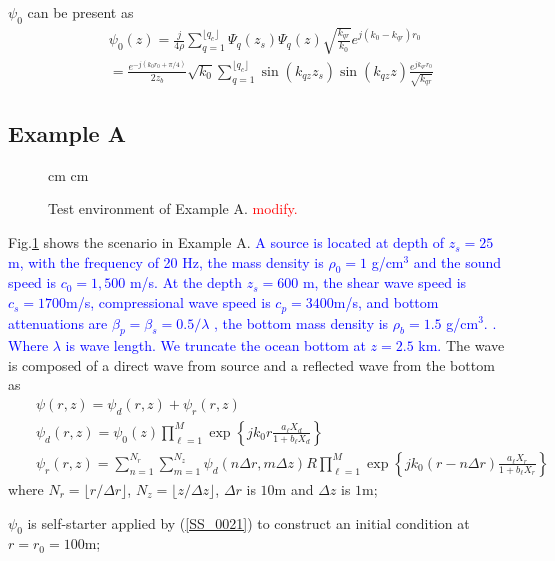 \documentclass[journal,onecolumn]{IEEEtran}
\begin{document}
$\psi_0$ can be present as
\begin{eqnarray}
&&\psi_0(z) = \frac{j}{4 \rho} \sum_{q = 1}^{\lfloor{q_c} \rfloor} \Psi_q(z_s) \Psi_q(z) \sqrt{\frac{k_{qr}}{k_0}} e^{j(k_0 - k_{qr}) r_0} 
\nonumber \\
&&= \frac{ e^{- j (k_0 r_0 + \pi / 4)} } {2 z_b} \sqrt{k_0}
\sum_{q = 1}^{\lfloor{q_c} \rfloor} \sin(k_{qz} z_s) \sin(k_{qz} z)
\frac{e^{j k_{qr} r_0}}{\sqrt{k_{qr}}}
\label{SS_0021}
\end{eqnarray}


\subsection{Example A}

\begin{figure}[h]
 cm
 cm
\caption{Test environment of Example A. 
\textcolor{red}{modify.}}
\label{Fig_pic2}
\end{figure}
Fig.\ref{Fig_pic2} shows the scenario in Example A.
\textcolor{blue}{
A source is located at depth of $z_s = 25$ m, with the frequency of 20 Hz, the mass density is $\rho_0 = 1 $ g/cm$^3$ and the sound speed is $c_0 = 1,500$ m/s.
At the depth $z_s = 600$ m, the shear wave speed is $c_s = 1700$m/s, compressional wave speed is $c_p = 3400$m/s, and bottom attenuations are $\beta_p = \beta_s = 0.5/ \lambda$ , the bottom mass density is $\rho_b =  1.5 $ g/cm$^3$. \cite{MDC_HOPA}. 
Where $\lambda$ is wave length.
We truncate the ocean bottom at $z = 2.5$ km.
}
The wave is composed of a direct wave from source and a reflected wave from the bottom as
\begin{eqnarray}
&&\psi(r, z) = \psi_d(r, z) + \psi_r(r, z)
\label{eqn_0025}\\
&&\psi_d(r, z) = \psi_0(z) \prod_{\ell = 1}^M \exp \left\{ j k_0 r \frac{a_\ell X_d}{1 + b_\ell X_d} \right\}
\label{eqn_0026} \\
&&\psi_r(r, z) = \sum_{n = 1}^{N_r}\sum_{m = 1}^{N_z} \psi_d(n \Delta r, m \Delta z) 
R \prod_{\ell = 1}^M \exp \left\{ j k_0 (r - n\Delta r) \frac{a_\ell X_r}{1 + b_\ell X_r} \right\} 
\label{eqn_0027} 
\end{eqnarray}
where $N_r = \lfloor r / \Delta r \rfloor$, $N_z = \lfloor z / \Delta z \rfloor$, $\Delta r$ is $10$m and $\Delta z$ is $1$m; 


$\psi_0$ is self-starter applied by (\ref{SS_0021}) to construct an initial condition 
at $r = r_0 = 100$m; 
\end{document}
